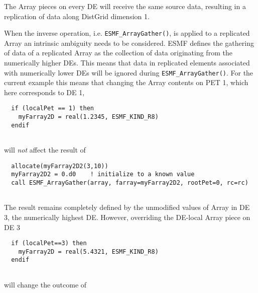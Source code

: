    The Array pieces on every DE will receive the same source data, resulting
   in a replication of data along DistGrid dimension 1. 

   When the inverse operation, i.e. {\tt ESMF\_ArrayGather()}, is applied to
   a replicated Array an intrinsic ambiguity needs to be considered. ESMF 
   defines the gathering of data of a replicated Array as the collection of data
   originating from the numerically higher DEs. This means that data in
   replicated elements associated with numerically lower DEs will be ignored
   during {\tt ESMF\_ArrayGather()}. For the current example this means that
   changing the Array contents on PET 1, which here corresponds to DE 1, 

 \begin{verbatim}
  if (localPet == 1) then
    myFarray2D = real(1.2345, ESMF_KIND_R8)
  endif
 
\end{verbatim}
 

   will {\em not} affect the result of 

 \begin{verbatim}
  allocate(myFarray2D2(3,10))
  myFarray2D2 = 0.d0    ! initialize to a known value
  call ESMF_ArrayGather(array, farray=myFarray2D2, rootPet=0, rc=rc)
 
\end{verbatim}
 

   The result remains completely defined by the unmodified values of Array in 
   DE 3, the numerically highest DE. However, overriding the DE-local Array
   piece on DE 3 

 \begin{verbatim}
  if (localPet==3) then
    myFarray2D = real(5.4321, ESMF_KIND_R8)
  endif
 
\end{verbatim}
 

   will change the outcome of 

